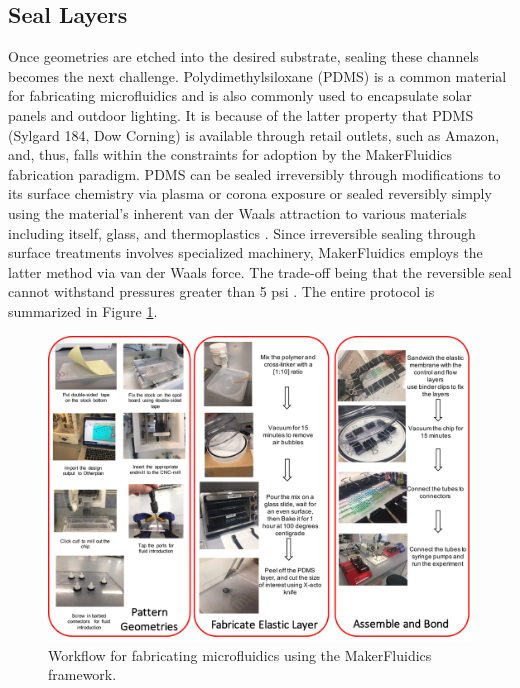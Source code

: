 \subsection{Seal Layers}
Once geometries are etched into the desired substrate, sealing these channels becomes the next challenge. Polydimethylsiloxane (PDMS) is a common material for fabricating microfluidics \cite{mcdonald2002poly} and is also commonly used to encapsulate solar panels and outdoor lighting. It is because of the latter property that PDMS (Sylgard 184, Dow Corning) is available through retail outlets, such as Amazon, and, thus, falls within the constraints for adoption by the MakerFluidics fabrication paradigm. PDMS can be sealed irreversibly through modifications to its surface chemistry via plasma or corona exposure or sealed reversibly simply using the material's inherent van der Waals attraction to various materials including itself, glass, and thermoplastics \cite{mcdonald2002poly}. Since irreversible sealing through surface treatments involves specialized machinery, MakerFluidics employs the latter method via van der Waals force. The trade-off being that the reversible seal cannot withstand pressures greater than 5 psi \cite{mcdonald2002poly}. The entire protocol is summarized in Figure \ref{fig:fabFlow}.


\begin{figure}[h]
  \begin{minipage}[t]{0.99\linewidth}\centering
    \includegraphics[width=14cm]{fabFlow.pdf}
    \medskip
  \end{minipage}\hfill
  \caption[The MakerFluidics fabrication protocol]{Workflow for fabricating microfluidics using the MakerFluidics framework.}
    \label{fig:fabFlow}
\end{figure}




